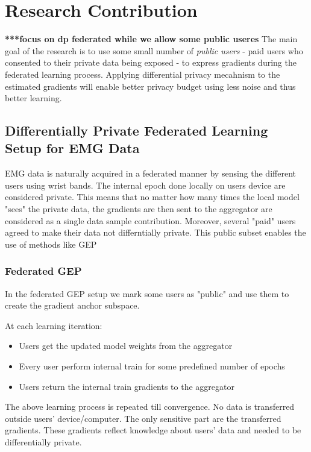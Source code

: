 \chapter{Research Contribution}
\textbf{***focus on dp federated while we allow some public useres}
The main goal of the research is to use some small number of \textit{public users} - paid users who consented to their private data being exposed - to express gradients during the federated learning process. Applying differential privacy mecahnism to the estimated gradients will enable better privacy budget using less noise and thus better learning.
\section{Differentially Private Federated Learning  Setup for EMG Data }
EMG data is naturally acquired in a federated manner by sensing the different users using wrist bands. The internal epoch done locally on users device are considered private. This means that no matter how many times the local model "sees" the private data, the gradients are then sent to the aggregator are considered as a single data sample contribution. Moreover, several "paid" users agreed to make their data not differntially private. This public subset enables the use of methods like GEP \cite{Yu2021DoLearning} 
\subsection{Federated GEP}
In the federated GEP setup we mark some users as "public" and use them to create the gradient anchor subspace. 

At each learning iteration:
\begin{itemize}
    \item Users get the updated model weights from the aggregator
    \item Every user perform internal train for some predefined number of epochs
    \item Users return the internal train gradients to the aggregator
\end{itemize}
 The above learning process is repeated till convergence. No data is transferred outside users' device/computer. The only sensitive part are the transferred gradients. These gradients reflect knowledge about users' data and needed to be differentially private.
